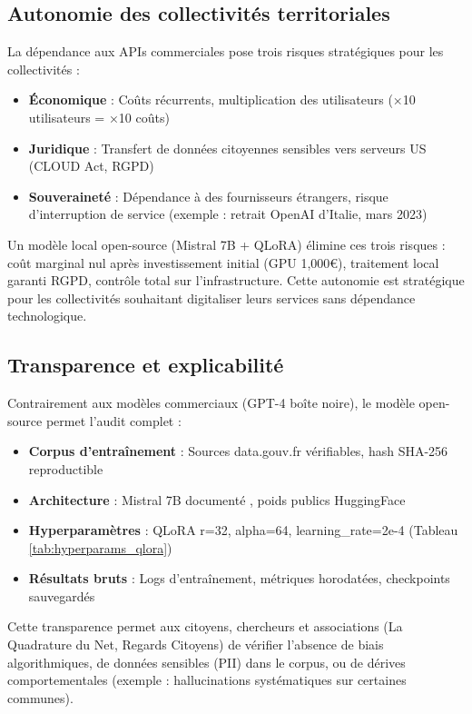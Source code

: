\subsection{Autonomie des collectivités territoriales}

La dépendance aux APIs commerciales pose trois risques stratégiques pour les collectivités :

\begin{itemize}
    \item \textbf{Économique} : Coûts récurrents, multiplication des utilisateurs (×10 utilisateurs = ×10 coûts)
    \item \textbf{Juridique} : Transfert de données citoyennes sensibles vers serveurs US (CLOUD Act, RGPD)
    \item \textbf{Souveraineté} : Dépendance à des fournisseurs étrangers, risque d'interruption de service (exemple : retrait OpenAI d'Italie, mars 2023)
\end{itemize}

Un modèle local open-source (Mistral 7B + QLoRA) élimine ces trois risques : coût marginal nul après investissement initial (GPU 1,000€), traitement local garanti RGPD, contrôle total sur l'infrastructure. Cette autonomie est stratégique pour les collectivités souhaitant digitaliser leurs services sans dépendance technologique.

\subsection{Transparence et explicabilité}

Contrairement aux modèles commerciaux (GPT-4 boîte noire), le modèle open-source permet l'audit complet :
\begin{itemize}
    \item \textbf{Corpus d'entraînement} : Sources data.gouv.fr vérifiables, hash SHA-256 reproductible
    \item \textbf{Architecture} : Mistral 7B documenté \citep{jiang2023mistral}, poids publics HuggingFace
    \item \textbf{Hyperparamètres} : QLoRA r=32, alpha=64, learning\_rate=2e-4 (Tableau \ref{tab:hyperparams_qlora})
    \item \textbf{Résultats bruts} : Logs d'entraînement, métriques horodatées, checkpoints sauvegardés
\end{itemize}

Cette transparence permet aux citoyens, chercheurs et associations (La Quadrature du Net, Regards Citoyens) de vérifier l'absence de biais algorithmiques, de données sensibles (PII) dans le corpus, ou de dérives comportementales (exemple : hallucinations systématiques sur certaines communes).

